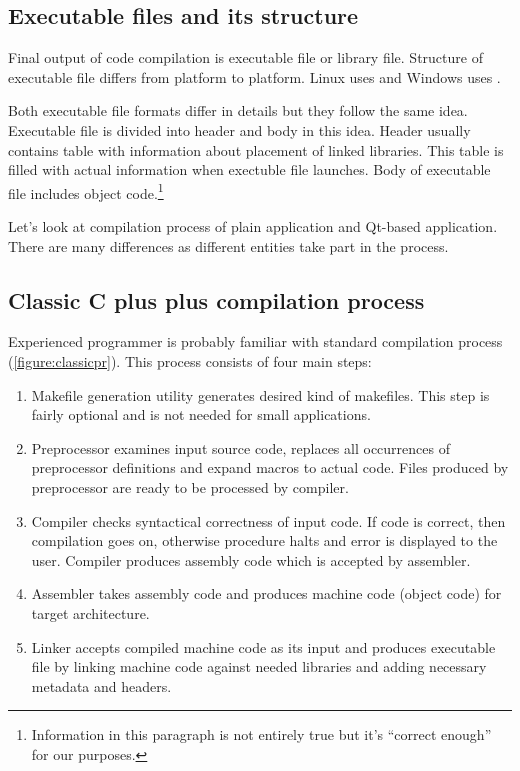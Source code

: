 \subsection{Executable files and its structure}
Final output of \cpp code compilation is executable file or library file. Structure of executable file differs from platform to platform. Linux uses  and Windows uses .

Both executable file formats differ in details but they follow the same idea. Executable file is divided into header and body in this idea. Header usually contains table with information about placement of linked libraries. This table is filled with actual information when exectuble file launches. Body of executable file includes object code.\footnote{Information in this paragraph is not entirely true but it's \enquote{correct enough} for our purposes.}

Let's look at compilation process of plain \cpp application and Qt-based application. There are many differences as different entities take part in the process.

\subsection{Classic C plus plus compilation process}
Experienced \cpp programmer is probably familiar with standard compilation process (\autoref{figure:classicpr}). This process consists of four main steps:
\begin{enumerate}
\item Makefile generation utility generates desired kind of makefiles. This step is fairly optional and is not needed for small applications.
\item Preprocessor examines input source code, replaces all occurrences of preprocessor definitions and expand macros to actual code. Files produced by preprocessor are ready to be processed by compiler.
\item Compiler checks syntactical correctness of input \cpp code. If code is correct, then compilation goes on, otherwise procedure halts and error is displayed to the user. Compiler produces assembly code which is accepted by assembler.
\item Assembler takes assembly code and produces machine code (object code) for target architecture.
\item Linker accepts compiled machine code as its input and produces executable file by linking machine code against needed libraries and adding necessary metadata and headers.
\end{enumerate}


